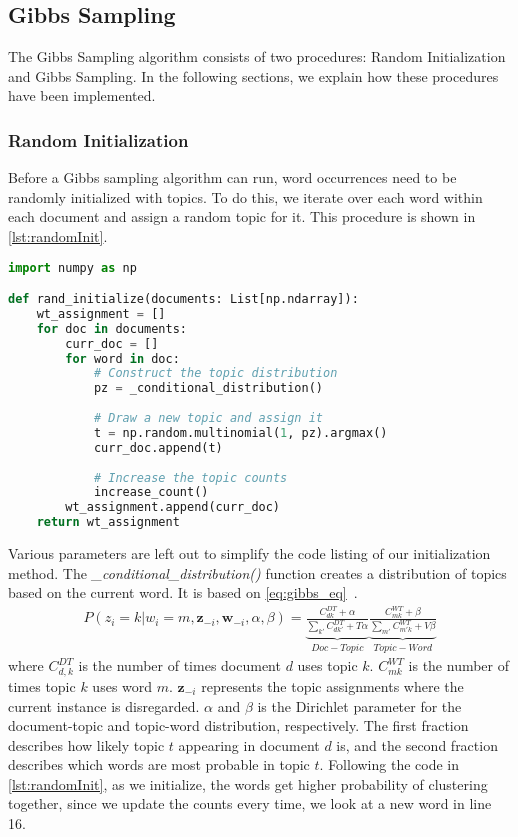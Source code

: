 \subsection{Gibbs Sampling}\label{sec:appendix_gibbs}
The Gibbs Sampling algorithm consists of two procedures: Random Initialization and Gibbs Sampling.
In the following sections, we explain how these procedures have been implemented.

\subsubsection{Random Initialization}
Before a Gibbs sampling algorithm can run, word occurrences need to be randomly initialized with topics.
To do this, we iterate over each word within each document and assign a random topic for it.
This procedure is shown in \autoref{lst:randomInit}.
\begin{lstlisting}[language=Python, caption=Random Initialization,label={lst:randomInit}, float, floatplacement=H]
import numpy as np

def rand_initialize(documents: List[np.ndarray]):
	wt_assignment = []
	for doc in documents:
		curr_doc = []
		for word in doc:
			# Construct the topic distribution
			pz = _conditional_distribution()
			
			# Draw a new topic and assign it
			t = np.random.multinomial(1, pz).argmax()
			curr_doc.append(t)
			
			# Increase the topic counts
			increase_count()
		wt_assignment.append(curr_doc)
	return wt_assignment
\end{lstlisting}

Various parameters are left out to simplify the code listing of our initialization method.
The \emph{\_conditional\_distribution()} function creates a distribution of topics based on the current word.
It is based on \autoref{eq:gibbs_eq}~\cite{author_topic_2012}.
\begin{equation}\label{eq:gibbs_eq}
	\begin{split}
		P(z_i = k|w_i = m, \boldsymbol{z}_{-i}, \boldsymbol{w}_{-i}, \alpha, \beta) = 
		\underbrace{\frac{C^{DT}_{dk} + \alpha}{\sum_{k'} C^{DT}_{dk'} + T\alpha}}_{Doc-Topic}
		\underbrace{\frac{C^{WT}_{mk} + \beta}{\sum_{m'} C^{WT}_{m'k} + V\beta}}_{Topic-Word}
	\end{split}
\end{equation}
where $C^{DT}_{d,k}$ is the number of times document $d$ uses topic $k$.
$C^{WT}_{mk}$ is the number of times topic $k$ uses word $m$.
$\boldsymbol{z}_{-i}$ represents the topic assignments where the current instance is disregarded.
$\alpha$ and $\beta$ is the Dirichlet parameter for the document-topic and topic-word distribution, respectively.
The first fraction describes how likely topic $t$ appearing in document $d$ is, and the second fraction describes which words are most probable in topic $t$.
Following the code in \autoref{lst:randomInit}, as we initialize, the words get higher probability of clustering together, since we update the counts every time, we look at a new word in line 16.

